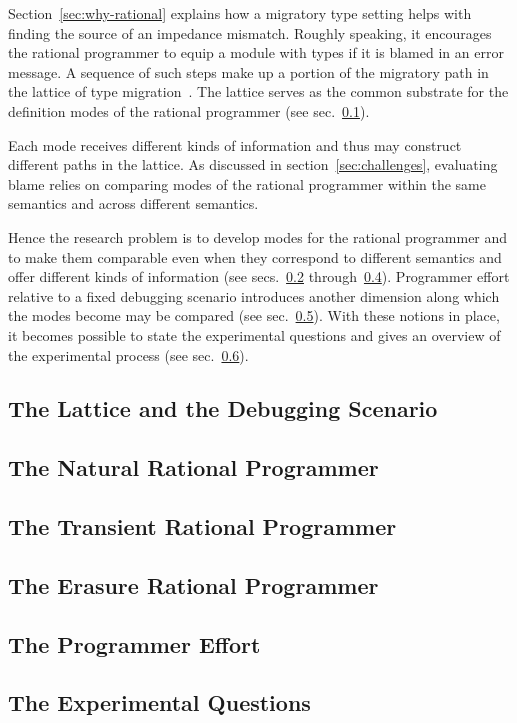 
Section~\ref{sec:why-rational} explains how a migratory type setting helps with
finding the source of an impedance mismatch. Roughly speaking, it encourages the
rational programmer to equip a module with types if it is blamed in an error
message. A sequence of such steps make up a portion of the migratory path in the
lattice of type migration~\citep{tfgnvf-popl-2016}. The lattice serves as the
common substrate for the definition modes of the rational programmer (see
sec.~\ref{sub:stuff}).

Each mode receives different kinds of information and thus may construct
different paths in the lattice. As discussed in section~\ref{sec:challenges},
evaluating blame relies on comparing modes of the rational programmer
within the same semantics and across different semantics.  

Hence the research problem is to develop modes for the rational programmer and to make
them comparable even when they correspond to different semantics and offer
different kinds of information (see secs.~\ref{sub:natural}
through~\ref{sub:erasure}). Programmer effort relative to a fixed debugging
scenario introduces another dimension along which the modes become may be
compared (see sec.~\ref{sub:effort}). With these notions in place, it
becomes possible to state the experimental questions and gives an overview of
the experimental process (see sec.~\ref{sub:experiment}).

\def\rsub#1#2{\subsection{#2} \label{sub:#1} }

\rsub{stuff}     {The Lattice and the Debugging Scenario} 
\rsub{natural}   {The Natural Rational Programmer} 
\rsub{transient} {The Transient Rational Programmer} 
\rsub{erasure}   {The Erasure Rational Programmer} 
\rsub{effort}    {The Programmer Effort} \label{subsec:effort}
\rsub{experiment}{The Experimental Questions} 
